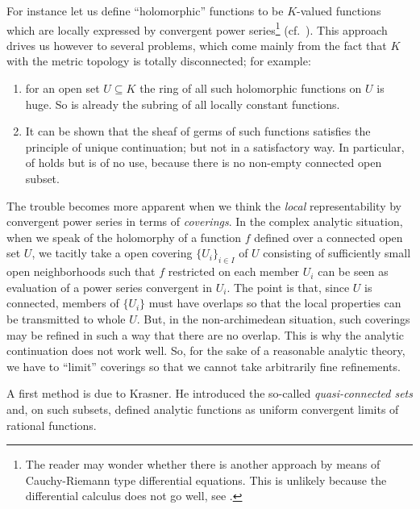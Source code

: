 For instance let us define ``holomorphic'' functions to be $K$-valued
functions which are locally expressed by convergent power
series\footnote{The reader may wonder whether there is another approach
by means of Cauchy-Riemann type differential equations.  This is unlikely
because the differential calculus does not go well, see
\cite[Chap.\ 4]{pn}.}  (cf.\ \cite[Chap.\ 4]{pn}). 
This approach drives us however to several
problems, which come mainly from the fact that $K$ with the
metric topology is totally disconnected; for example:
\begin{enumerate}
 \item for an open set $U\subseteq K$ the ring of all such holomorphic
       functions on $U$ is huge. So is already the subring of all locally 
       constant functions.
 \item It can be shown that the sheaf of germs of such functions satisfies
       the principle of unique continuation; but not in a satisfactory way.
       In particular,  of 
       holds but is of no use,
       because there is no non-empty connected open subset.
\end{enumerate}

The trouble becomes more apparent when we think the \emph{local}
representability by convergent power series in terms of
\emph{coverings}.  In the complex analytic situation, when we speak of
the holomorphy of a function $f$ defined over a connected open set $U$,
we tacitly take a open covering $\{U_i\}_{i\in I}$ of $U$ consisting of
sufficiently small open neighborhoods such that $f$ restricted on each
member $U_i$ can be seen as evaluation of a power series convergent in
$U_i$.  The point is that, since $U$ is connected, members of $\{U_i\}$
must have overlaps so that the local properties can be transmitted to
whole $U$.  But, in the non-archimedean situation, such coverings may be
refined in such a way that there are no overlap.  This is why
the analytic continuation does not work well.  So, for the sake of a
reasonable analytic theory, we have to ``limit'' coverings so that we
cannot take arbitrarily fine refinements.

A first method is due to Krasner.
He introduced the so-called {\it quasi-connected sets} and, on such
subsets, defined analytic functions as uniform convergent limits of
rational functions.

